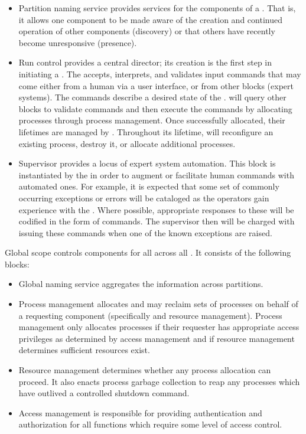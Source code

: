 \begin{itemize}
\item Partition naming service provides  services for the components of a . 
  That is, it allows one component to be made aware of the creation and continued operation of other components (discovery) or that others have recently become unresponsive (presence). 

\item Run control provides a central director;  its creation is the first step in initiating a . 
  The  accepts, interprets, and validates input commands that may come either from a human via a user interface, or from other blocks (expert systems). 
  The commands describe a desired state of the . 
   will query other blocks to validate commands and then execute the commands by allocating processes through process management. 
  Once successfully allocated, their lifetimes are managed by . 
  Throughout its lifetime,  will reconfigure an existing process, destroy it, or allocate additional processes. 

\item Supervisor provides a locus of expert system automation. 
  This block is instantiated by the  in order to augment or facilitate human commands with automated ones. 
  For example, it is expected that some set of commonly occurring exceptions or errors will be cataloged as the operators gain experience with the .   Where possible, appropriate responses to these will be codified in the form of  commands.  The supervisor then will be charged with issuing these commands when one of the known exceptions are raised.

\end{itemize}

Global scope controls  components for all  across all .  It consists of the following blocks:


\begin{itemize}
\item Global naming service aggregates the  information across partitions.  

\item Process management allocates and may reclaim sets of processes on behalf of a requesting component (specifically  and resource management). 
  Process management only allocates processes if their requester has appropriate access privileges as determined by access management and if resource management determines sufficient resources exist. 
  
\item Resource management determines whether any process allocation can proceed.  It also enacts process garbage collection to reap any processes which have outlived a controlled shutdown command.

  
\item Access management is responsible for providing authentication and authorization for all  functions which require some level of access control. 

\end{itemize}

